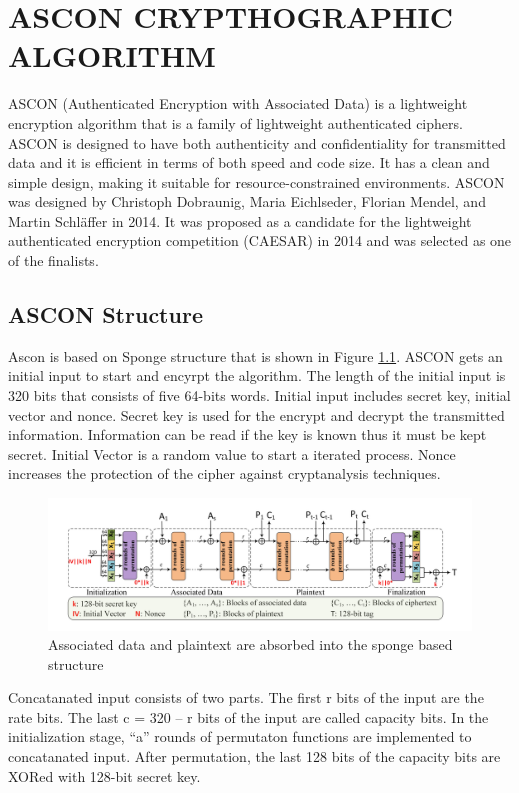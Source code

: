 \clearpage
\chapter{ASCON CRYPTHOGRAPHIC ALGORITHM }\label{Chascon}
ASCON (Authenticated Encryption with Associated Data) is a lightweight encryption algorithm that is a family of lightweight authenticated ciphers. ASCON is designed to have both authenticity and confidentiality for transmitted data and it is efficient in terms of both speed and code size. It has a clean and simple design, making it suitable for resource-constrained environments. 
ASCON was designed by Christoph Dobraunig, Maria Eichlseder, Florian Mendel, and Martin Schläffer in 2014. It was proposed as a candidate for the lightweight authenticated encryption competition (CAESAR) in 2014 and was selected as one of the finalists.

\section{ASCON Structure}
Ascon is based on Sponge structure that is shown in Figure \ref{fig:sbox_structure}. ASCON gets an initial input to start and encyrpt the algorithm. The length of the initial input is 320 bits that consists of five 64-bits words. Initial input includes secret key, initial vector and nonce. Secret key is used for the encrypt and decrypt the transmitted information. Information can be read if the key is known thus it must be kept secret. Initial Vector is a random value to start a iterated process. Nonce increases the protection of the cipher against cryptanalysis techniques. 

\begin{figure}
    \centering
    \includegraphics[scale = 0.4]{ascon_sbox/s_box_structure.png}
    \caption{Associated data and plaintext are absorbed into the sponge based structure}
    \label{fig:sbox_structure}
\end{figure}
Concatanated input consists of two parts. The first r bits of the input are the rate bits. The last c = 320 – r bits of the input are called capacity bits. In the initialization stage, “a” rounds of permutaton functions are implemented to concatanated input. After permutation, the last 128 bits of the capacity bits are XORed with 128-bit secret key. 

